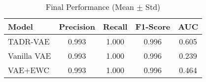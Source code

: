 \begin{table}[ht]
\centering
\caption{Final Performance (Mean $\pm$ Std)}
\begin{tabular}{lcccc}
\toprule
Model & Precision & Recall & F1-Score & AUC \\
\midrule
TADR-VAE & 0.993 & 1.000 & 0.996 & 0.605 \\
Vanilla VAE & 0.993 & 1.000 & 0.996 & 0.239 \\
VAE+EWC & 0.993 & 1.000 & 0.996 & 0.464 \\
\bottomrule
\end{tabular}
\end{table}
